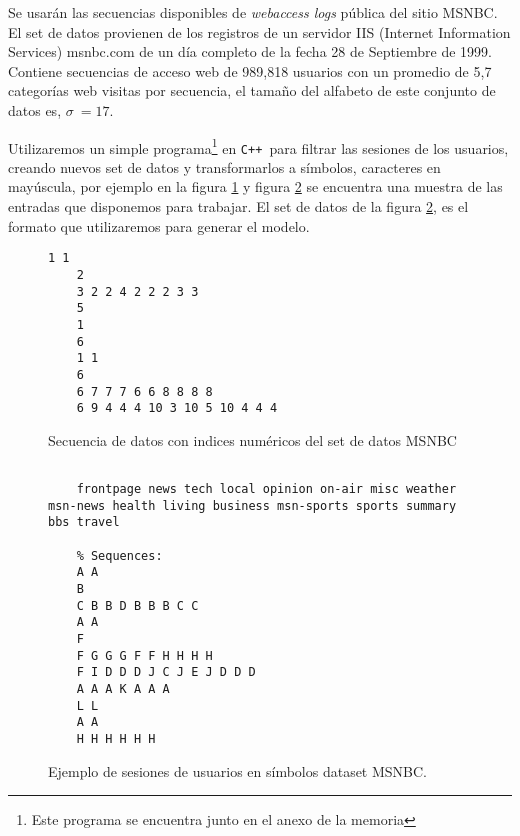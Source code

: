 
Se usarán las secuencias disponibles de \emph{webaccess logs} pública del sitio MSNBC. El set de datos provienen de los registros de un servidor {IIS} (Internet Information Services) msnbc.com de un día completo de la fecha  28 de Septiembre de 1999. 
Contiene secuencias de acceso web de 989,818 usuarios con un promedio de 5,7 categorías web visitas por secuencia, el tamaño del alfabeto de este conjunto de datos es, $\sigma \ = 17$.




Utilizaremos un simple programa\footnote{Este programa se encuentra junto en el anexo de la memoria} en \texttt{C++ }para filtrar las sesiones de los usuarios, creando nuevos set de datos y transformarlos a símbolos, caracteres en mayúscula, por ejemplo en la figura \ref{fig:sesiones-ds-msbc-num}  y figura \ref{fig:sesiones-ds-basicos} se encuentra una muestra de las entradas que disponemos para trabajar. El set de datos de la figura \ref{fig:sesiones-ds-basicos}, es el formato que utilizaremos para generar el modelo.


\begin{figure}[t] 
	\centering
	\begin{lstlisting}[frame=single,basicstyle=\ttfamily\tiny,]
	1 1 
	2 
	3 2 2 4 2 2 2 3 3 
	5 
	1 
	6 
	1 1 
	6 
	6 7 7 7 6 6 8 8 8 8 
	6 9 4 4 4 10 3 10 5 10 4 4 4 
	\end{lstlisting}	
	\caption{Secuencia de datos con indices numéricos del set de datos MSNBC}
	\label{fig:sesiones-ds-msbc-num}
\end{figure}




\begin{figure}[t] 
	\centering
	\begin{lstlisting}[frame=single,basicstyle=\ttfamily\tiny,]
	% Different categories found in input file:
	
	frontpage news tech local opinion on-air misc weather msn-news health living business msn-sports sports summary bbs travel
	
	% Sequences:
	A A 
	B 
	C B B D B B B C C 
	A A 
	F 
	F G G G F F H H H H 
	F I D D D J C J E J D D D 
	A A A K A A A 
	L L 
	A A 
	H H H H H H 
	\end{lstlisting}
	\caption{Ejemplo de sesiones de usuarios en símbolos dataset MSNBC.}
	\label{fig:sesiones-ds-basicos}
\end{figure}






